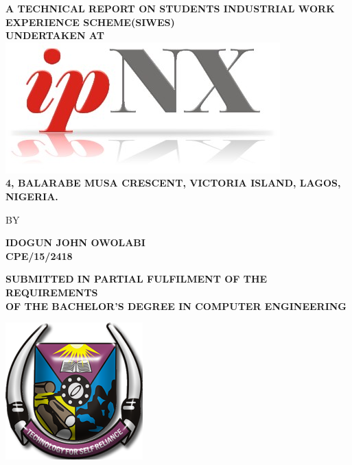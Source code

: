 \begin{titlepage}


\begin{center}
{\bf A TECHNICAL REPORT ON STUDENTS INDUSTRIAL WORK EXPERIENCE SCHEME(SIWES)\\ \vspace{.1em}UNDERTAKEN AT\\} \vspace{.7em}
\includegraphics[scale=6]{./ipnx}
{\bf \\4, BALARABE MUSA CRESCENT, VICTORIA ISLAND, LAGOS, NIGERIA.}

\end{center}

\vfill

\begin{center}
BY
\end{center}

\vfill
\begin{center}
{\large \bf IDOGUN JOHN OWOLABI\\ CPE/15/2418}\\
\end{center}


\vfill


\begin{center}
{\bf \uppercase{Submitted in partial fulfilment of the requirements \\of the Bachelor's degree in Computer Engineering}}
\end{center}

\vfill

	
\begin{center}
\includegraphics[scale=4]{./futa}
\end{center}


\end{titlepage}
